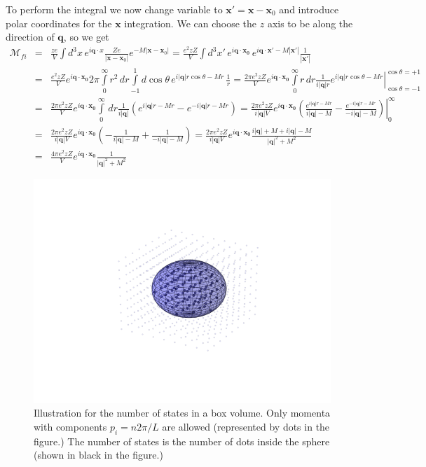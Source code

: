 \documentclass[12pt]{article}
\newcommand{\V}[1]{\mathbf{#1}}
\begin{document}
To perform the integral we now change variable to $\V{x'}=\V{x}-\V{x}_0$ and introduce polar coordinates for the $\V{x}$ integration. We can choose the $z$ axis to be along the direction of $\V{q}$, so we get
\begin{eqnarray*}\label{eq:Mfi}
   \mathcal{M}_{fi}&=&
  \frac{ze}{V}\int d^3x\,e^{i\V{q}\cdot x}\frac{Ze}{\left|\V{x}-\V{x}_0\right|}e^{-M\left|\V{x}-\V{x}_0\right|}
  =
  \frac{e^2zZ}{V}\int d^3x'\,e^{i\V{q}\cdot \V{x_0}}\,e^{i\V{q}\cdot \V{x'}-M|\V{x'}|}\frac{1}{\left|\V{x'}\right|}\\
  &=&
  \frac{e^2zZ}{V}e^{i\V{q}\cdot \V{x_0}}2\pi\int\limits_0^\infty r^2\, dr\int\limits_{-1}^{1}d\cos\theta \,e^{i|\V{q}|r\cos\theta-Mr}\,\frac{1}{r}
  =
  \frac{2\pi e^2zZ}{V}e^{i\V{q}\cdot \V{x_0}}\int\limits_0^\infty r\, dr\left. \frac{1}{i|\V{q}|r}e^{i|\V{q}|r\cos\theta-Mr}\right|_{\cos\theta=-1}^{\cos\theta=+1}\\
  &=&\frac{2\pi e^2zZ}{V}e^{i\V{q}\cdot \V{x_0}}\int\limits_0^\infty \, dr\frac{1}{i|\V{q}|}\left(e^{i|\V{q}|r-Mr}-e^{-i|\V{q}|r-Mr}\right)
  =
  \frac{2\pi e^2zZ}{i|\V{q}|V}e^{i\V{q}\cdot \V{x_0}} \left. \left(\frac{e^{i|\V{q}|r-Mr}}{i|\V{q}|-M}-\frac{e^{-i|\V{q}|r-Mr}}{-i|\V{q}|-M}\right)\right|_0^\infty
  \\
  &=&
  \frac{2\pi e^2zZ}{i|\V{q}|V}e^{i\V{q}\cdot \V{x_0}}  \left(-\frac{1}{i|\V{q}|-M}+\frac{1}{-i|\V{q}|-M}\right)
  =
    \frac{2\pi e^2zZ}{i|\V{q}|V}e^{i\V{q}\cdot \V{x_0}}  \frac{i|\V{q}|+M+i|\V{q}|-M}{|\V{q}|^2+M^2}
\\    &=&
    \frac{4\pi e^2zZ}{V}e^{i\V{q}\cdot \V{x_0}}  \frac{1}{|\V{q}|^2+M^2}
\end{eqnarray*}

  

\begin{figure}
	\includegraphics[scale=0.7,trim=5cm 5cm 5cm 5cm,clip=true]{images/PSsphere.png}
 \caption{Illustration for the number of states in a box volume. Only momenta with components $p_i=n 2\pi/L$ are allowed (represented by dots in the figure.) The number of states is the number of dots inside the sphere (shown in black in the figure.) }\label{fig:densityOfStates}
\end{figure}
\end{document}
